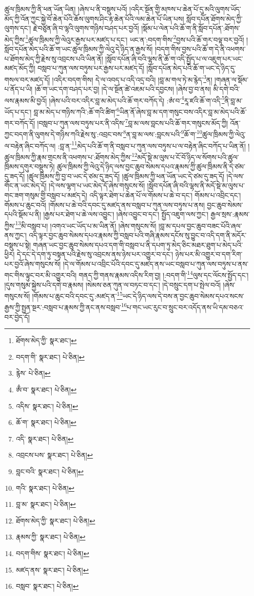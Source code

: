 ཚུལ་ཁྲིམས་ཀྱི་ནི་ཕན་ཡོན་ཡིན། །ཞེས་པ་ནི་བསྡུས་པའོ། །འདིར་སྔོན་གྱི་མཁས་པ་ཆེན་པོ་དུ་མའི་ལུགས་ཡོད་མོད་ཀྱི་འོན་ཀྱང་སྐྱེ་བོ་ཆེན་པོའི་ཆོས་ལུགས་ཤིང་རྟ་ཆེན་པོའི་ལམ་ཆེན་པོ་ཡིན་པས། སློབ་དཔོན་ཐོགས་མེད་ཀྱི་ལུགས་དང་། རྗེ་བཙུན་ཞི་བ་ལྷའི་ལུགས་གཉིས་བཤད་པར་བྱའོ། །སྡོམ་པ་ལེན་པའི་ཆོ་ག་ནི་སློབ་དཔོན་:ཐོགས་མེད་ཀྱིས་\footnote{ཐོགས་མེད་ཀྱི་  སྣར་ཐང་། }ཚུལ་ཁྲིམས་ཀྱི་ལེའུར་རྒྱས་པར་མཛད་པ་དང་། ཡང་ན་:བདག་གིས་\footnote{བདག་གི་  སྣར་ཐང་།  པེ་ཅིན། }བྱས་པའི་ཆོ་གར་བལྟ་བར་བྱའོ། །སློབ་དཔོན་མེད་པའི་ཆོ་ག་ཡང་ཚུལ་ཁྲིམས་ཀྱི་ལེའུ་དེ་ཉིད་ན་རྒྱས་སོ། །བདག་གིས་བྱས་པའི་ཆོ་ག་དེ་ནི་འཕགས་པ་ཐོགས་མེད་ཀྱི་རྗེས་སུ་འབྲངས་པའི་ཡིན་ནོ། །སློབ་དཔོན་ཞི་བའི་ལྷས་ནི་ཆོ་ག་འདི་སྤྱོད་པ་ལ་འཇུག་པར་ཡང་མཛད་མོད་ཀྱི། བསླབ་པ་ཀུན་ལས་བཏུས་པར་རྒྱས་པར་མཛད་དོ། །སློབ་དཔོན་མེད་པའི་ཆོ་ག་ཡང་དེ་ཉིད་དུ་གསལ་བར་མཛད་དོ། །འདིར་བདག་གིས། དེ་ལ་འབད་པ་འདི་འདྲ་བའི། །བླ་མ་གལ་ཏེ་མ་རྙེད་\footnote{རྙེས་  པེ་ཅིན། }ན། །གཞན་ལ་སྡོམ་པ་ནོད་པ་ཡི། །ཆོ་ག་ཡང་དག་བཤད་པར་བྱ། །དེ་ལ་སྔོན་ཚེ་འཇམ་པའི་དབྱངས། །ཞེས་བྱ་བ་ནས། མི་དགེ་བའི་ལས་རྣམས་མི་བྱའོ། །ཞེས་པའི་བར་འདིར་བླ་མ་མེད་པའི་ཆོ་གར་བཀོད་དེ། :ཨཾ་བ་\footnote{ཨྃ་བ་  སྣར་ཐང་།  པེ་ཅིན། }རཱ་ཛའི་ཆོ་ག་འདི་\footnote{འདིས་  སྣར་ཐང་།  པེ་ཅིན། }ནི་བླ་མ་ཡོད་པ་དང་། བླ་མ་མེད་པ་གཉིས་ཀའི་:ཆོ་གའི་ཚིག་\footnote{ཆོ་ག་  སྣར་ཐང་།  པེ་ཅིན། }ཡིན་ནོ་ཞེས་བླ་མ་དག་གསུང་བས་འདིར་བླ་མ་མེད་པའི་ཆོ་གར་བཀོད་དོ། །བསླབ་པ་ཀུན་ལས་བཏུས་པར་ནི་འདིས་\footnote{འདི་  སྣར་ཐང་།  པེ་ཅིན། }བླ་མ་ལས་བླངས་པའི་ཆོ་གར་གསུངས་མོད་ཀྱི། འོན་ཀྱང་བདག་ནི་ལུགས་དེ་གཉིས་ཀའི་རྗེས་སུ་:འབྲང་བས་\footnote{འབྲངས་པས་  སྣར་ཐང་།  པེ་ཅིན། }ན་བླ་མ་ལས་:བླངས་པའི་\footnote{བླང་བའི་  སྣར་ཐང་།  པེ་ཅིན། }ཆོ་ག་\footnote{གའི་  སྣར་ཐང་།  པེ་ཅིན། }ཚུལ་ཁྲིམས་ཀྱི་ལེའུ་ལ་བརྟེན་ཞིང་བཀོད་ལ། :བླ་ན་\footnote{བླ་མ་  སྣར་ཐང་།  པེ་ཅིན། }མེད་པའི་ཆོ་ག་ནི་བསླབ་པ་ཀུན་ལས་བཏུས་པ་ལ་བརྟེན་ཞིང་བཀོད་པ་ཡིན་ནོ། །ཚུལ་ཁྲིམས་ཀྱི་རྣམ་གྲངས་ནི་འཕགས་པ་:ཐོགས་མེད་ཀྱིས་\footnote{ཐོགས་མེད་ཀྱི་  སྣར་ཐང་།  པེ་ཅིན། }མདོ་སྡེ་མ་ལུས་པ་ངོ་བོ་ཉིད་ལ་སོགས་པའི་ཚུལ་ཁྲིམས་དགུར་བསྡུས་ཏེ། ཚུལ་ཁྲིམས་ཀྱི་ལེའུ་དེ་ཉིད་ལས་བྱང་ཆུབ་སེམས་དཔའ་རྣམས་ཀྱི་ཚུལ་ཁྲིམས་ནི་དེ་ཙམ་དུ་ཟད་དོ། །ཚུལ་ཁྲིམས་ཀྱི་བྱ་བ་ཡང་དེ་ཙམ་དུ་ཟད་དོ། །ཚུལ་ཁྲིམས་ཀྱི་ཕན་ཡོན་ཡང་དེ་ཙམ་དུ་ཟད་དོ། །དེ་ལས་གོང་ན་ཡང་མེད་དོ། །དེ་ལས་ལྷག་པ་ཡང་མེད་དོ་ཞེས་གསུངས་སོ། །སློབ་དཔོན་ཞི་བའི་ལྷས་ནི་མདོ་སྡེ་མ་ལུས་པ་གང་ཟག་གསུམ་གྱི་བསླབ་པ་མཛད་དེ། འདི་ལྟར་ཐེག་པ་ཆེན་པོ་ལ་གོམས་པ་ཆེ་བ་དང་། གོམས་པ་འབྲིང་དང་། གོམས་པ་ཆུང་བའོ། །གོམས་པ་ཆེ་བའི་དབང་དུ་མཛད་ནས་བསླབ་པ་ཀུན་ལས་བཏུས་པ་ནས། བྱང་ཆུབ་སེམས་དཔའི་སྡོམ་པ་ནི། །རྒྱས་པར་ཐེག་པ་ཆེ་ལས་འབྱུང་། །ཞེས་འབྱུང་བ་དང་། སྤྱོད་འཇུག་ལས་ཀྱང་། རྒྱལ་སྲས་:རྣམས་ཀྱིས་\footnote{རྣམས་ཀྱི་  སྣར་ཐང་།  པེ་ཅིན། }མི་བསླབ་པ། །འགའ་ཡང་ཡོད་པ་མ་ཡིན་ནོ། །ཞེས་གསུངས་སོ། །བླ་མ་དཔལ་བྱང་ཆུབ་བཟང་པོའི་ཞལ་ནས་ཀྱང་། འདི་ལྟར་བྱང་ཆུབ་སེམས་དཔའ་རྣམས་ཀྱི་བསླབ་པའི་གཞི་རྣམས་དངོས་སུ་བྱུང་བ་འདི་དག་ནི་མདོར་བསྡུས་པ་སྟེ། གཞན་ཡང་བྱང་ཆུབ་སེམས་དཔའ་དག་གི་བསླབ་པ་ནི་དཔག་ཏུ་མེད་ཅིང་མཐར་ཐུག་པ་མེད་པའི་ཕྱིར། དེ་དང་དེ་དག་ཏུ་བསྟན་པའི་རྗེས་སུ་འབྲངས་ནས་ཉེས་པར་འགྱུར་བ་དང་། ཉེས་པར་མི་འགྱུར་བ་དག་རིག་པར་བྱའོ་ཞེས་གསུངས་སོ། །དེ་ལ་གོམས་པ་འབྲིང་པོའི་དབང་དུ་མཛད་ནས་ཡང་བསླབ་པ་ཀུན་ལས་བཏུས་པ་ནས་གང་གིས་ལྟུང་བར་མི་འགྱུར་བའི། གནད་ཀྱི་གནས་རྣམས་འདིས་རིག་བྱ། །:བདག་གི་\footnote{བདག་གིས་  སྣར་ཐང་།  པེ་ཅིན། }ལུས་དང་ལོངས་སྤྱོད་དང་། །དུས་གསུམ་སྐྱེས་པའི་དགེ་བ་རྣམས། །སེམས་ཅན་ཀུན་ལ་བཏང་བ་དང་། །དེ་བསྲུང་དག་པ་སྤེལ་བའོ། །ཞེས་གསུངས་སོ། །གོམས་པ་ཆུང་བའི་དབང་དུ་:མཛད་ན་\footnote{མཛད་ནས་  སྣར་ཐང་།  པེ་ཅིན། }ཡང་དེ་ཉིད་ལས་དེ་བས་ན་བྱང་ཆུབ་སེམས་དཔའ་སངས་རྒྱས་ཀྱི་སྤྱན་སྔར་:བསླབ་པ་རྣམས་ཀྱི་ནང་ནས་བསླབ་\footnote{བསླབ་  སྣར་ཐང་།  པེ་ཅིན། }པ་གང་ཡང་རུང་བ་སྲུང་བར་འདོད་ནས་ཡི་དམ་བཅའ་བར་བྱེད་དོ། 